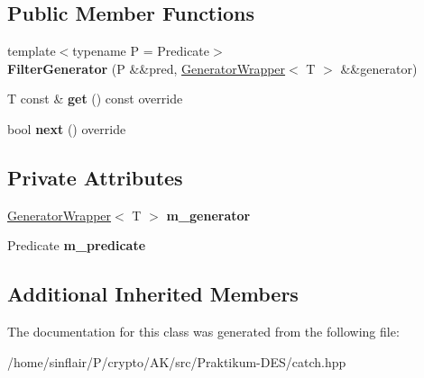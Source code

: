 \subsection*{Public Member Functions}
\begin{DoxyCompactItemize}
\item 
\mbox{\label{classCatch_1_1Generators_1_1FilterGenerator_aa16886a5e41cbd3b6ffa3dd52388a3a1}} 
{\footnotesize template$<$typename P  = Predicate$>$ }\\{\bfseries Filter\+Generator} (P \&\&pred, \hyperlink{classCatch_1_1Generators_1_1GeneratorWrapper}{Generator\+Wrapper}$<$ T $>$ \&\&generator)
\item 
\mbox{\label{classCatch_1_1Generators_1_1FilterGenerator_ab30e81b61a77430661d40f814758f6fe}} 
T const  \& {\bfseries get} () const override
\item 
\mbox{\label{classCatch_1_1Generators_1_1FilterGenerator_a02ce0839dcaa7545c55d0fe70cc50e84}} 
bool {\bfseries next} () override
\end{DoxyCompactItemize}
\subsection*{Private Attributes}
\begin{DoxyCompactItemize}
\item 
\mbox{\label{classCatch_1_1Generators_1_1FilterGenerator_a6fb6975b1401cf7bd7e76e3a542a45cf}} 
\hyperlink{classCatch_1_1Generators_1_1GeneratorWrapper}{Generator\+Wrapper}$<$ T $>$ {\bfseries m\+\_\+generator}
\item 
\mbox{\label{classCatch_1_1Generators_1_1FilterGenerator_a51cda8aafad62eba1d26618f3ca8cff1}} 
Predicate {\bfseries m\+\_\+predicate}
\end{DoxyCompactItemize}
\subsection*{Additional Inherited Members}


The documentation for this class was generated from the following file\+:\begin{DoxyCompactItemize}
\item 
/home/sinflair/\+P/crypto/\+A\+K/src/\+Praktikum-\/\+D\+E\+S/catch.\+hpp\end{DoxyCompactItemize}
